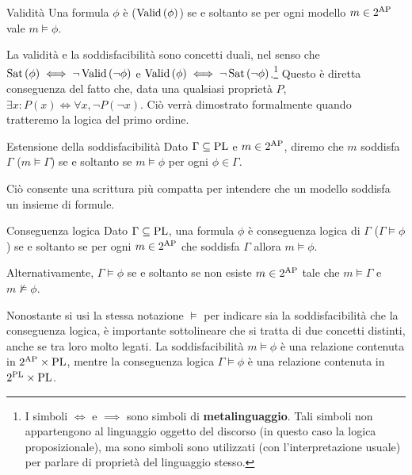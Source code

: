 \begin{definition}{Validità}
  Una formula \(\phi\) è  (\(\Valid[\phi]\)) se e soltanto se per ogni modello \(m\in 2^{\AP}\) vale \(m \models \phi\).
\end{definition}

La validità e la soddisfacibilità sono concetti duali, nel senso che \(\Sat[\phi]\iff \neg \Valid[\neg \phi]\) e \(\Valid[\phi] \iff \neg \Sat[\neg \phi]\).\footnote{I simboli \(\iff\) e \(\implies\) sono simboli di \textbf{metalinguaggio}. Tali simboli non appartengono al linguaggio oggetto del discorso (in questo caso la logica proposizionale), ma sono simboli sono utilizzati (con l'interpretazione usuale) per parlare di proprietà del linguaggio stesso.}
Questo è diretta conseguenza del fatto che, data una qualsiasi proprietà \(P\), \(\exists x:P(x) \iff \forall x, \neg P(\neg x)\). Ciò verrà dimostrato formalmente quando tratteremo la logica del primo ordine.

\begin{definition}{Estensione della soddisfacibilità}
  Dato \(\Gamma \subseteq \operatorname{PL}\) e \(m \in 2^{\AP}\), diremo che \(m\) soddisfa \(\Gamma\) (\(m \models \Gamma\)) se e soltanto se \(m \models \phi\) per ogni \(\phi \in \Gamma\).
\end{definition}
Ciò consente una scrittura più compatta per intendere che un modello soddisfa un insieme di formule.

\begin{definition}{Conseguenza logica}
  Dato \(\Gamma \subseteq \operatorname{PL}\), una formula \(\phi\) è conseguenza logica di \(\Gamma\) (\(\Gamma \models \phi\)) se e soltanto se per ogni \(m \in 2^{\AP}\) che soddisfa \(\Gamma\) allora \(m \models \phi\).

  Alternativamente, \(\Gamma \models \phi\) se e soltanto se non esiste \(m \in 2^{\AP}\) tale che \(m \models \Gamma\) e \(m \not\models \phi\).
\end{definition}

\begin{note}{}
  Nonostante si usi la stessa notazione \(\models\) per indicare sia la soddisfacibilità che la conseguenza logica, è importante sottolineare che si tratta di due concetti distinti, anche se tra loro molto legati.
  La soddisfacibilità \(m \models \phi\) è una relazione contenuta in \(2^{\AP}\times \PL\), mentre la conseguenza logica \(\Gamma \models \phi\) è una relazione contenuta in \(2^{\operatorname{PL}}\times \operatorname{PL}\).
\end{note}

